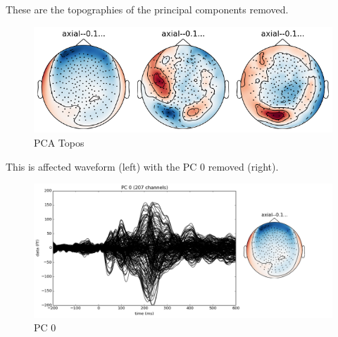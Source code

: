\documentclass[english]{article}
\begin{document}
These are the topographies of the principal components removed.
\begin{figure}[H]
\begin{centering}
\includegraphics[scale=0.33]{pca-topos}
\par\end{centering}
\caption{\label{fig:pca-topos} PCA Topos}
\end{figure}

This is affected waveform (left) with the PC 0 removed (right).
\begin{figure}[H]
\begin{centering}
\includegraphics[scale=0.33]{pca-0}
\par\end{centering}
\caption{\label{fig:pca-0} PC 0}
\end{figure}
%
%
\end{document}
